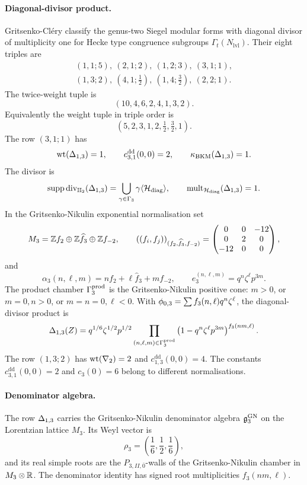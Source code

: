 \paragraph{Diagonal-divisor product.}
Gritsenko-Cl\'ery classify the genus-two Siegel modular forms with
diagonal divisor of multiplicity one for Hecke type congruence
subgroups \(\Gamma_t(N_{\mathrm{lvl}})\).  Their eight triples are
\[
\begin{gathered}
 (1,1;5),\ (2,1;2),\ (1,2;3),\ (3,1;1),\\
 (1,3;2),\ (4,1;\tfrac12),\ (1,4;\tfrac32),\ (2,2;1).
\end{gathered}
\]
The twice-weight tuple is
\[
  (10,4,6,2,4,1,3,2).
\]
Equivalently the weight tuple in triple order is
\[
  (5,2,3,1,2,\tfrac12,\tfrac32,1).
\]
The row \((3,1;1)\) has
\[
  \operatorname{wt}(\Delta_{1,3})=1,
  \qquad
  c^{\mathrm{dd}}_{3,1}(0,0)=2,
  \qquad
  \kappa_{\mathrm{BKM}}(\Delta_{1,3})=1.
\]
The divisor is
\[
  \operatorname{supp}\operatorname{div}_{\mathbb{H}_{2}}(\Delta_{1,3})
  =
  \bigcup_{\gamma\in\Gamma_{3}}\gamma\langle\mathcal{H}_{\mathrm{diag}}\rangle,
  \qquad
  \operatorname{mult}_{\mathcal{H}_{\mathrm{diag}}}(\Delta_{1,3})=1.
\]
In the Gritsenko-Nikulin exponential normalisation set
\[
  M_3=\mathbb{Z} f_2\oplus\mathbb{Z}\widehat f_3\oplus\mathbb{Z} f_{-2},
  \qquad
  \left((f_i,f_j)\right)_{(f_2,\widehat f_3,f_{-2})}
  =
  \begin{pmatrix}
    0&0&-12\\
    0&2&0\\
    -12&0&0
  \end{pmatrix},
\]
and
\[
  \alpha_3(n,\ell,m)=nf_2+\ell\widehat f_3+mf_{-2},
  \qquad
  e_3^{(n,\ell,m)}=q^n\zeta^\ell p^{3m}.
\]
The product chamber \(\Gamma_{3}^{\mathrm{prod}}\) is the Gritsenko-Nikulin positive
cone: \(m>0\), or \(m=0,n>0\), or \(m=n=0,\ell<0\).  With
\(\phi_{0,3}=\sum f_3(n,\ell)q^n\zeta^\ell\), the diagonal-divisor
product is
\[
  \Delta_{1,3}(Z)
  =
  q^{1/6}\zeta^{1/2}p^{1/2}
  \prod_{(n,\ell,m)\in\Gamma_{3}^{\mathrm{prod}}}
  \left(1-q^n\zeta^\ell p^{3m}\right)^{f_3(nm,\ell)}.
\]
The row \((1,3;2)\) has \(\operatorname{wt}(\nabla_{2})=2\) and
\(c^{\mathrm{dd}}_{1,3}(0,0)=4\).  The constants
\(c^{\mathrm{dd}}_{3,1}(0,0)=2\) and \(c_3(0)=6\) belong to different
normalisations.

\paragraph{Denominator algebra.}
The row \(\Delta_{1,3}\) carries the Gritsenko-Nikulin denominator
algebra \(\mathfrak{g}_{3}^{\mathrm{GN}}\) on the Lorentzian lattice \(M_3\).  Its Weyl
vector is
\[
  \rho_3=\left(\frac16,\frac12,\frac16\right),
\]
and its real simple roots are the \(P_{3,II,\overline0}\)-walls of the
Gritsenko-Nikulin chamber in \(M_3\otimes\mathbb{R}\).  The denominator identity
has signed root multiplicities \(f_3(nm,\ell)\).

